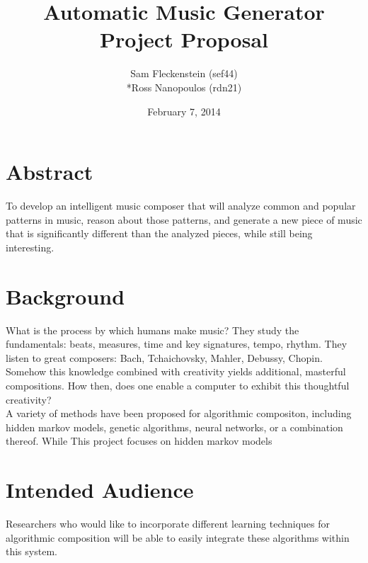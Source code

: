 \documentclass{article}
\begin{document}
\clearpage
{}
\begin{center}
\begin{minipage}{.6\textwidth}

\title{Automatic Music Generator \\ \vspace{2 pt} \Large{Project Proposal}}
\author{Sam Fleckenstein (sef44)\\*Ross Nanopoulos (rdn21)}
\date{February 7, 2014}
\maketitle

\end{minipage}
\end{center}
\clearpage

\tableofcontents
\newpage

\section{Abstract}
To develop an intelligent music composer that will analyze common and popular patterns in music, reason about those patterns, and generate a new piece of music that is significantly different than the analyzed pieces, while still being interesting.

\section{Background}
What is the process by which humans make music?  They study the fundamentals: beats, measures, time and key signatures, tempo, rhythm.  They listen to great composers: Bach, Tchaichovsky, Mahler, Debussy, Chopin.  Somehow this knowledge combined with creativity yields additional, masterful compositions.  How then, does one enable a computer to exhibit this thoughtful creativity?
\\
A variety of methods have been proposed for algorithmic compositon, including hidden markov models, genetic algorithms, neural networks, or a combination thereof.  While This project focuses on hidden markov models 

\section{Intended Audience}
Researchers who would like to incorporate different learning techniques for algorithmic composition will be able to easily integrate these algorithms within this system.
\end{document}
